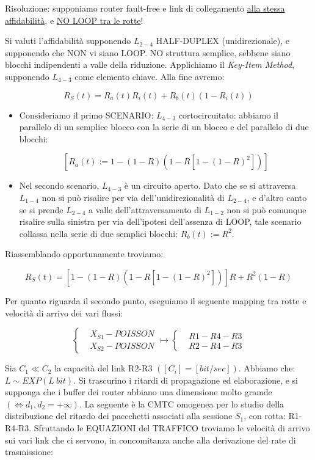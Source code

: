 Risoluzione: supponiamo router fault-free e link di collegamento \underline{alla stessa affidabilità}, e \underline{NO LOOP tra le rotte}!

Si valuti l'affidabilità supponendo $L_{2-4}$ HALF-DUPLEX (unidirezionale), e supponendo che NON vi siano LOOP. NO struttura semplice, sebbene siano blocchi indipendenti a valle della riduzione. Applichiamo il \textit{Key-Item Method}, supponendo $L_{4-3}$ come elemento chiave. Alla fine avremo:

\[
	R_S(t) = R_a(t)R_i(t) + R_b(t)(1-R_i(t))
\]

\begin{itemize}

\item

Consideriamo il primo SCENARIO: $L_{4-3}$ cortocircuitato: abbiamo il parallelo di un semplice blocco con la serie di un blocco e del parallelo di due blocchi:

\[
	[R_a(t) := 1-(1-R)(1-R[1-(1-R)^2])]
\]

\item

Nel secondo scenario, $L_{4-3}$ è un circuito aperto. Dato che se si attraversa $L_{1-4}$ non si può risalire per via dell'unidirezionalità di $L_{2-4}$, e d'altro canto se si prende $L_{2-4}$ a valle dell'attraversamento di $L_{1-2}$ non si può comunque risalire sulla sinistra per via dell'ipotesi dell'assenza di LOOP, tale scenario collassa nella serie di due semplici blocchi: $R_b(t) := R^2$.

\end{itemize}

Riassemblando opportunamente troviamo:

\[
	R_S(t) = [1-(1-R)(1-R[1-(1-R)^2])]R + R^2(1-R)
\]


Per quanto riguarda il secondo punto, eseguiamo il seguente mapping tra rotte e velocità di arrivo dei vari flussi:

\[	
	\left\{
	\begin{aligned}
	&X_{S1}-POISSON\\
	&X_{S2}-POISSON
	\end{aligned}
	\right.\mapsto\left\{
	\begin{aligned}
	&R1-R4-R3\\
	&R2-R4-R3
	\end{aligned}
	\right.
\]

Sia $C_1\ll C_2$ la capacità del link R2-R3 $([C_i]=[bit/sec])$. Abbiamo che: $\mathit{L}\sim EXP(L\ bit)$. Si trascurino i ritardi di propagazione ed elaborazione, e si supponga che i buffer dei router abbiano una dimensione molto gramde $(\iff d_1,d_2=+\infty)$. La seguente è la CMTC omogenea per lo studio della distribuzione del ritardo dei paccchetti associati alla sessione $S_1$, con rotta: R1-R4-R3. Sfruttando le EQUAZIONI del TRAFFICO troviamo le velocità di arrivo sui vari link che ci servono, in concomitanza anche alla derivazione del rate di trasmissione:


